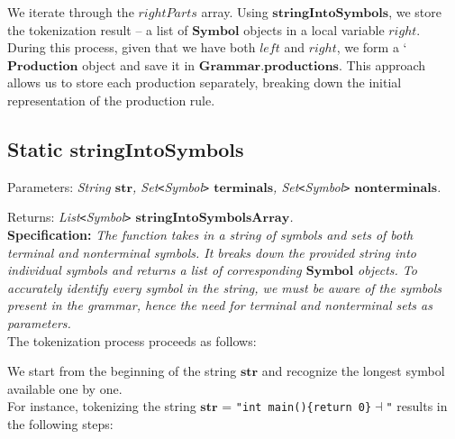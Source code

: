 We iterate through the \(rightParts\) array. Using \(\boldsymbol{stringIntoSymbols}\), we store the tokenization result – a list of \(\boldsymbol{Symbol}\) objects in a local variable \(right\). During this process, given that we have both \(left\) and \(right\), we form a ‘\(\boldsymbol{Production}\) object and save it in \(\boldsymbol{Grammar.productions}\). This approach allows us to store each production separately, breaking down the initial representation of the production rule.

\vspace{30pt}

\subsection*{Static \(\boldsymbol{stringIntoSymbols}\)}

Parameters: \textit{String \(\boldsymbol{str}\), Set\texttt{<}Symbol\texttt{>} \(\boldsymbol{terminals}\), Set\texttt{<}Symbol\texttt{>} \(\boldsymbol{nonterminals}\).}

Returns: \textit{ List\texttt{<}Symbol\texttt{>} \(\boldsymbol{stringIntoSymbolsArray}\).}\\

\textbf{Specification:} \textit{The function takes in a string of symbols and sets of both terminal and nonterminal symbols. It breaks down the provided string into individual symbols and returns a list of corresponding \(\boldsymbol{Symbol}\) objects. To accurately identify every symbol in the string, we must be aware of the symbols present in the grammar, hence the need for terminal and nonterminal sets as parameters.}\\

The tokenization process proceeds as follows:

We start from the beginning of the string \(\boldsymbol{str}\) and recognize the longest symbol available one by one.\\

For instance, tokenizing the string \(\boldsymbol{str}\) = \texttt{"int main()\{return 0\}\( \dashv \)"} results in the following steps:

